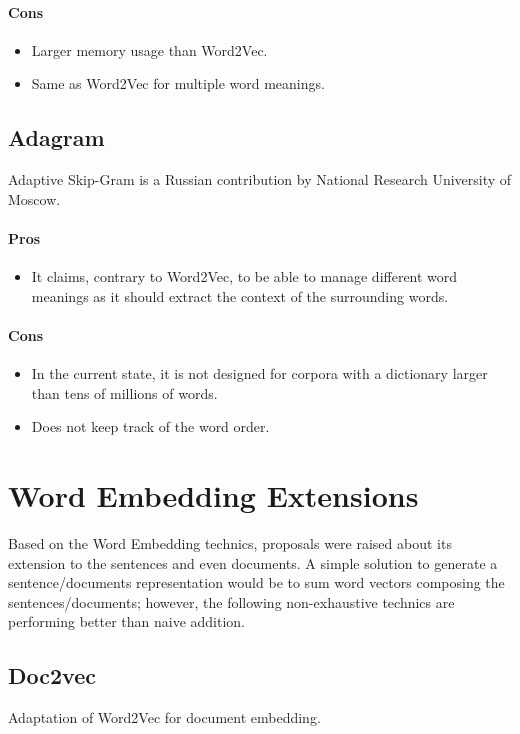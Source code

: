 \paragraph{Cons}
\begin{itemize}
    \setlength\itemsep{0em}
    \item Larger memory usage than Word2Vec.
    \item Same as Word2Vec for multiple word meanings.
\end{itemize}


\subsection{Adagram\cite{article:adagram}}
\label{sec:adagram}
Adaptive Skip-Gram is a Russian contribution by National Research University of Moscow.
\paragraph{Pros}
\begin{itemize}
    \setlength\itemsep{0em}
    \item It claims, contrary to Word2Vec, to be able to manage different word meanings as it should extract the context of the surrounding words.
\end{itemize}
\paragraph{Cons}
\begin{itemize}
    \setlength\itemsep{0em}
    \item In the current state, it is not designed for corpora with a dictionary larger than tens of millions of words.
    \item Does not keep track of the word order.
\end{itemize}


\section{Word Embedding Extensions}
Based on the Word Embedding technics, proposals were raised about its extension to the sentences and even documents. A simple solution to generate a sentence/documents representation would be to sum word vectors composing the sentences/documents; however, the following non-exhaustive technics are performing better than naive addition.

\subsection{Doc2vec\cite{article:doc2vec}}
Adaptation of Word2Vec for document embedding.
